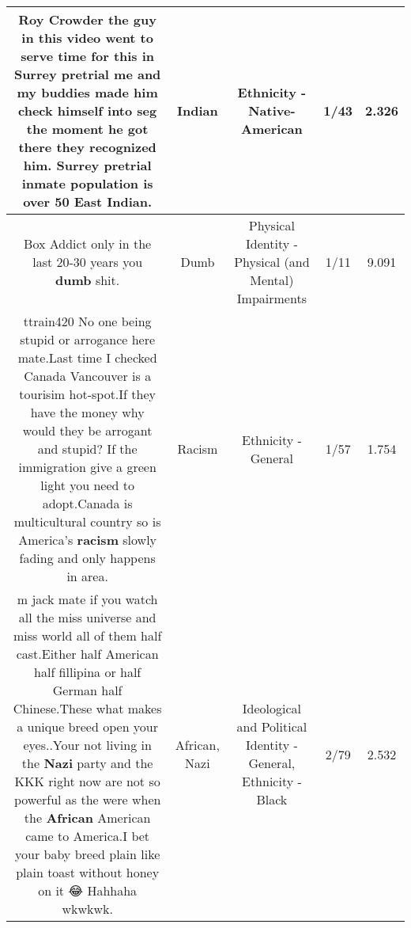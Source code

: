 \documentclass[11pt]{article}
\newlength\mylength
\begin{document}
\begin{center}
\begin{longtable}{|C{.65\mylength}|C{.30\mylength}|C{.12\mylength}|C{.12\mylength}|C{.12\mylength}|}
  \small Roy Crowder the guy in this video went to serve time for this in Surrey pretrial me and my buddies made him check himself into seg the moment he got there they recognized him. Surrey pretrial inmate population is over 50 East \textbf{Indian}.\normalsize   & Indian & Ethnicity - Native-American & 1/43 & 2.326 \\  \hline
  \small Box Addict only in the last 20-30 years you \textbf{dumb} shit.\normalsize   & Dumb & Physical Identity - Physical (and Mental) Impairments & 1/11 & 9.091 \\  \hline
  \small ttrain420 No one being stupid or arrogance here mate.Last time I checked Canada Vancouver is a tourisim hot-spot.If they have the money why would they be arrogant and stupid? If the immigration give a green light you need to adopt.Canada is multicultural country so is America's \textbf{racism} slowly fading and only happens in area.\normalsize   & Racism & Ethnicity - General & 1/57 & 1.754 \\  \hline
  \small m jack mate if you watch all the miss universe and miss world all of them half cast.Either half American half fillipina or half German half Chinese.These what makes a unique breed open your eyes..Your not living in the \textbf{Nazi} party and the KKK right now are not so powerful as the were when the \textbf{African} American came to America.I bet your baby breed plain like plain toast without honey on it 😂 Hahhaha wkwkwk.\normalsize   & African, Nazi &  Ideological and Political Identity - General, Ethnicity - Black & 2/79 & 2.532 \\  \hline

\end{longtable}
\end{center}
\end{document}
